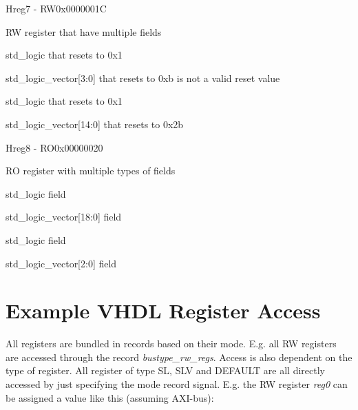 \documentclass{article}
\begin{document}
\begin{register}{H}{reg7 - RW}{0x0000001C}
  \par RW register that have multiple fields \regnewline
  \label{reg7}
\regnewline
  \begin{regdesc}\begin{reglist}[field0]
    \item [field0] std{\_}logic that resets to 0x1    \item [field1] std{\_}logic{\_}vector[3:0] that resets to 0xb is not a valid reset value    \item [field2] std{\_}logic that resets to 0x1    \item [field3] std{\_}logic{\_}vector[14:0] that resets to 0x2b  \end{reglist}\end{regdesc}
\end{register}

\begin{register}{H}{reg8 - RO}{0x00000020}
  \par RO register with multiple types of fields \regnewline
  \label{reg8}
\regnewline
  \begin{regdesc}\begin{reglist}[field0]
    \item [field0] std{\_}logic field    \item [field1] std{\_}logic{\_}vector[18:0] field    \item [field2] std{\_}logic field    \item [field3] std{\_}logic{\_}vector[2:0] field  \end{reglist}\end{regdesc}
\end{register}

\section{Example VHDL Register Access}

\par
All registers are bundled in records based on their mode. E.g. all RW registers are accessed through the record \textit{bustype\_rw\_regs}. Access is also dependent on the type of register. All register of type SL, SLV and DEFAULT are all directly accessed by just specifying the mode record signal. E.g. the RW register \textit{reg0} can be assigned a value like this (assuming AXI-bus):
\end{document}
